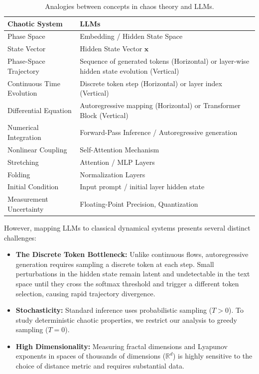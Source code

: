 \documentclass[a4paper,12pt]{article}
\begin{document}
    \begin{table}[H]
        \centering
        \begin{tabularx}{\textwidth}{@{} l X @{}}
        \toprule
        \textbf{Chaotic System} & \textbf{LLMs} \\ \midrule
        Phase Space & Embedding / Hidden State Space \\
        State Vector & Hidden State Vector $\mathbf{x}$ \\
        Phase-Space Trajectory & Sequence of generated tokens (Horizontal) or layer-wise hidden state evolution (Vertical) \\
        Continuous Time Evolution & Discrete token step (Horizontal) or layer index (Vertical) \\
        Differential Equation & Autoregressive mapping (Horizontal) or Transformer Block (Vertical) \\
        Numerical Integration & Forward-Pass Inference / Autoregressive generation \\
        Nonlinear Coupling & Self-Attention Mechanism \\
        Stretching & Attention / MLP Layers \\
        Folding & Normalization Layers \\
        Initial Condition & Input prompt / initial layer hidden state \\
        Measurement Uncertainty & Floating-Point Precision, Quantization \\ \bottomrule
        \end{tabularx}
        \caption{Analogies between concepts in chaos theory and LLMs.}
        \label{tab:analogy}
    \end{table}

    However, mapping LLMs to classical dynamical systems presents several distinct challenges:
    \begin{itemize}
        \item \textbf{The Discrete Token Bottleneck:} Unlike continuous flows, autoregressive generation requires sampling a discrete token at each step. Small perturbations in the hidden state remain latent and undetectable in the text space until they cross the softmax threshold and trigger a different token selection, causing rapid trajectory divergence.
        \item \textbf{Stochasticity:} Standard inference uses probabilistic sampling ($T > 0$). To study deterministic chaotic properties, we restrict our analysis to greedy sampling ($T = 0$).
        \item \textbf{High Dimensionality:} Measuring fractal dimensions and Lyapunov exponents in spaces of thousands of dimensions ($\mathbb{R}^d$) is highly sensitive to the choice of distance metric and requires substantial data.
    \end{itemize}
\end{document}
